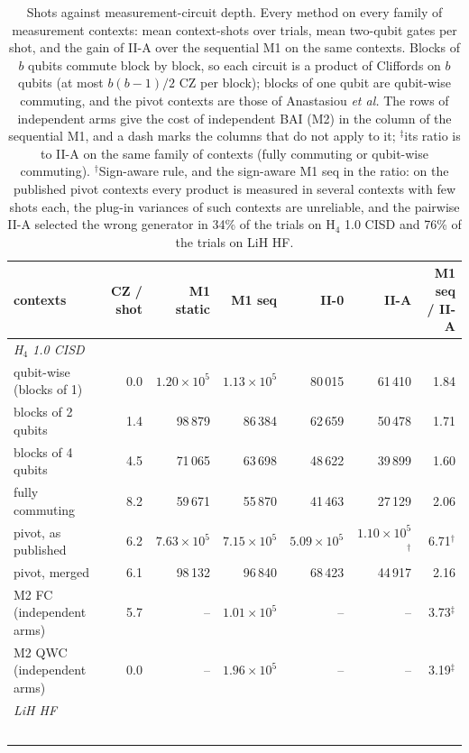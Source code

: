 \documentclass[aps,pra,reprint,superscriptaddress,nofootinbib]{revtex4-2}
\begin{document}
\begin{table}[!htb]
\centering\small
\caption{Shots against measurement-circuit depth. Every method on every family of measurement contexts: mean context-shots over trials, mean two-qubit gates per shot, and the gain of II-A over the sequential M1 on the same contexts. Blocks of $b$ qubits commute block by block, so each circuit is a product of Cliffords on $b$ qubits (at most $b(b-1)/2$ CZ per block); blocks of one qubit are qubit-wise commuting, and the pivot contexts are those of Anastasiou \textit{et al.} The rows of independent arms give the cost of independent BAI (M2) in the column of the sequential M1, and a dash marks the columns that do not apply to it; $^\ddagger$its ratio is to II-A on the same family of contexts (fully commuting or qubit-wise commuting). $^\dagger$Sign-aware rule, and the sign-aware M1 seq in the ratio: on the published pivot contexts every product is measured in several contexts with few shots each, the plug-in variances of such contexts are unreliable, and the pairwise II-A selected the wrong generator in 34\% of the trials on H$_4$ 1.0 CISD and 76\% of the trials on LiH HF.}
\label{tab:depth}
\begin{tabular}{lrrrrrr}
\toprule
contexts & CZ / shot & M1 static & M1 seq & II-0 & II-A & M1 seq / II-A \\
\midrule
\multicolumn{7}{l}{\emph{H$_4$ 1.0 CISD}} \\
qubit-wise (blocks of 1) & 0.0 & $1.20\times10^{5}$ & $1.13\times10^{5}$ & 80\,015 & 61\,410 & 1.84 \\
blocks of 2 qubits & 1.4 & 98\,879 & 86\,384 & 62\,659 & 50\,478 & 1.71 \\
blocks of 4 qubits & 4.5 & 71\,065 & 63\,698 & 48\,622 & 39\,899 & 1.60 \\
fully commuting & 8.2 & 59\,671 & 55\,870 & 41\,463 & 27\,129 & 2.06 \\
pivot, as published & 6.2 & $7.63\times10^{5}$ & $7.15\times10^{5}$ & $5.09\times10^{5}$ & $1.10\times10^{5}$$^\dagger$ & 6.71$^\dagger$ \\
pivot, merged & 6.1 & 98\,132 & 96\,840 & 68\,423 & 44\,917 & 2.16 \\
M2 FC (independent arms) & 5.7 & -- & $1.01\times10^{5}$ & -- & -- & 3.73$^\ddagger$ \\
M2 QWC (independent arms) & 0.0 & -- & $1.96\times10^{5}$ & -- & -- & 3.19$^\ddagger$ \\
\midrule
\multicolumn{7}{l}{\emph{LiH HF}} \\
$$
\end{tabular}
\end{table}
\end{document}
